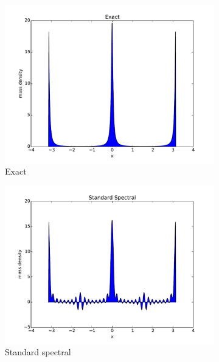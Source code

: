 \documentclass[final,leqno]{siamltex1213}
\begin{document}
\begin{figure}
	\begin{subfigure}{0.3\textwidth}
		\includegraphics[width=\textwidth]{./images/exact_1D.pdf}
		\caption{Exact}
		\label{fig:exact}
	\end{subfigure}
	\begin{subfigure}{0.3\textwidth}
		\includegraphics[width=\textwidth]{./images/standard_spectral_1D.pdf}
		\caption{Standard spectral}
		\label{fig:standard spectral}
	\end{subfigure}
	\begin{subfigure}{0.3\textwidth}

\end{subfigure}
\end{figure}
\end{document}
